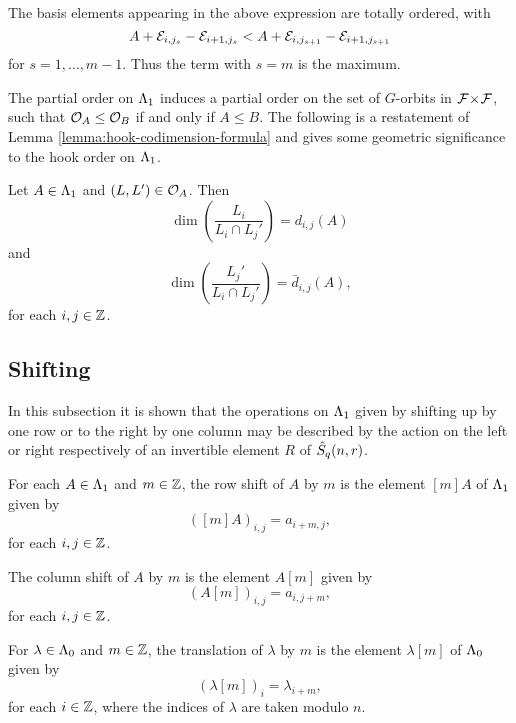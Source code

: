 \documentclass[a4paper, 11pt, twoside]{report}
\begin{document}
The basis elements appearing in the above expression are totally ordered, with
\begin{equation*}
A+\mathcal{E}_{i,j_s}-\mathcal{E}_{i+1,j_s} < A+\mathcal{E}_{i,j_{s+1}}-\mathcal{E}_{i+1,j_{s+1}}
\end{equation*}
for $s=1,\ldots,m-1$. Thus the term with $s=m$ is the maximum.

The partial order on $\Lambda_1{}$ induces a partial order on the set of $G$-orbits in ${\mathcal{F}\!\times\!\mathcal{F}}$, such that $\mathcal{O}_{A}\le \mathcal{O}_{B}$ if and only if $A\le B$. The following is a restatement of Lemma \ref{lemma:hook-codimension-formula} and gives some geometric significance to the hook order on $\Lambda_1{}$.

\begin{lemma}
Let $A\in\Lambda_1{}$ and $(L,L')\in\mathcal{O}_{A}$. Then
\begin{equation*}
\dim\left(\frac{L_i}{L_i\cap L_j'}\right) = d_{i,j}{(A)}
\end{equation*}
and
\begin{equation*}
\dim\left(\frac{L_j'}{L_i\cap L_j'}\right) = \bar{d}_{i,j}{(A)},
\end{equation*}
for each $i,j\in\mathbb{Z}$.
\end{lemma}


\subsection{Shifting}

In this subsection it is shown that the operations on $\Lambda_1{}$ given by shifting up by one row or to the right by one column may be described by the action on the left or right respectively of an invertible element $R$ of $\hat{S}_q(n,r)$.

For each $A\in\Lambda_1{}$ and $m\in\mathbb{Z}$, the row shift of $A$ by $m$ is the element $[m]A$ of $\Lambda_1{}$ given by
\begin{equation*}
([m]A)_{i,j} = a_{i+m,j},
\end{equation*}
for each $i,j\in\mathbb{Z}$.

The column shift of $A$ by $m$ is the element $A[m]$ given by
\begin{equation*}
(A[m])_{i,j} = a_{i,j+m},
\end{equation*}
for each $i,j\in\mathbb{Z}$.

For $\lambda\in\Lambda_0{}$ and $m\in\mathbb{Z}$, the translation of $\lambda$ by $m$ is the element $\lambda[m]$ of $\Lambda_0{}$ given by
\begin{equation*}
(\lambda[m])_i = \lambda_{i+m},
\end{equation*}
for each $i\in\mathbb{Z}$, where the indices of $\lambda$ are taken modulo $n$.
\end{document}
